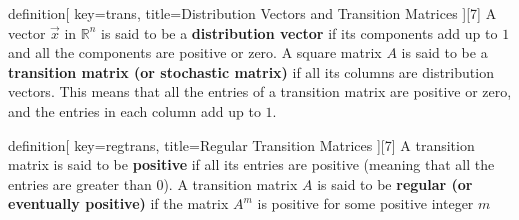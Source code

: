 \begin{SaveConcept}{definition}[
		key=trans,
		title={Distribution Vectors and Transition Matrices}
	][7]
	A vector $\vec x$  in $\mathbb R^n$ is said to be a \textbf{distribution vector} if its components add up to $1$
and all the components are positive or zero.
A square matrix $A$ is said to be a \textbf{transition matrix (or stochastic matrix)} if all
its columns are distribution vectors. This means that all the entries of a transition
matrix are positive or zero, and the entries in each column add up to $1$.
\end{SaveConcept}


\begin{SaveConcept}{definition}[
		key=regtrans,
		title={Regular Transition Matrices}
	][7]
A transition matrix is said to be \textbf{positive} if all its entries are positive (meaning
that all the entries are greater than 0).
A transition matrix $A$ is said to be \textbf{regular (or eventually positive)} if the matrix $A^m$ is positive for some positive integer $m$
\end{SaveConcept}


